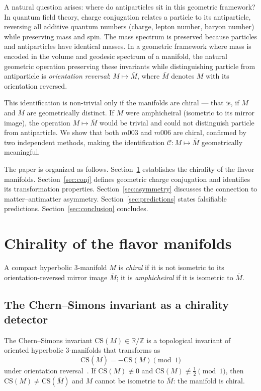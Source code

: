 \documentclass[12pt]{article}
\theoremstyle{definition}
\begin{document}
A natural question arises: where do antiparticles sit in this geometric
framework? In quantum field theory, charge conjugation relates a particle
to its antiparticle, reversing all additive quantum numbers (charge,
lepton number, baryon number) while preserving mass and spin. The mass
spectrum is preserved because particles and antiparticles have identical
masses. In a geometric framework where mass is encoded in the volume and
geodesic spectrum of a manifold, the natural geometric operation
preserving these invariants while distinguishing particle from
antiparticle is \emph{orientation reversal}: $M \mapsto \bar{M}$, where
$\bar{M}$ denotes $M$ with its orientation reversed.

This identification is non-trivial only if the manifolds are chiral ---
that is, if $M$ and $\bar{M}$ are geometrically distinct. If $M$ were
amphicheiral (isometric to its mirror image), the operation $M\mapsto
\bar{M}$ would be trivial and could not distinguish particle from
antiparticle. We show that both $m003$ and $m006$ are chiral, confirmed
by two independent methods, making the identification $\mathcal{C}:
M\mapsto\bar{M}$ geometrically meaningful.

The paper is organized as follows. Section~\ref{sec:chirality}
establishes the chirality of the flavor manifolds. Section~\ref{sec:conj}
defines geometric charge conjugation and identifies its transformation
properties. Section~\ref{sec:asymmetry} discusses the connection to
matter--antimatter asymmetry. Section~\ref{sec:predictions} states
falsifiable predictions. Section~\ref{sec:conclusion} concludes.

\section{Chirality of the flavor manifolds}
\label{sec:chirality}

A compact hyperbolic 3-manifold $M$ is \emph{chiral} if it is not
isometric to its orientation-reversed mirror image $\bar{M}$; it is
\emph{amphicheiral} if it is isometric to $\bar{M}$.

\subsection{The Chern--Simons invariant as a chirality detector}

The Chern--Simons invariant $\mathrm{CS}(M) \in \mathbb{R}/\mathbb{Z}$
is a topological invariant of oriented hyperbolic 3-manifolds that
transforms as
\begin{equation}
  \mathrm{CS}(\bar{M}) = -\mathrm{CS}(M) \pmod{1}
  \label{eq:cs_reversal}
\end{equation}
under orientation reversal~\cite{Meyerhoff1987}. If
$\mathrm{CS}(M) \not\equiv 0$ and $\mathrm{CS}(M) \not\equiv
\tfrac{1}{2} \pmod{1}$, then $\mathrm{CS}(M) \neq \mathrm{CS}(\bar{M})$
and $M$ cannot be isometric to $\bar{M}$: the manifold is chiral.
\end{document}
